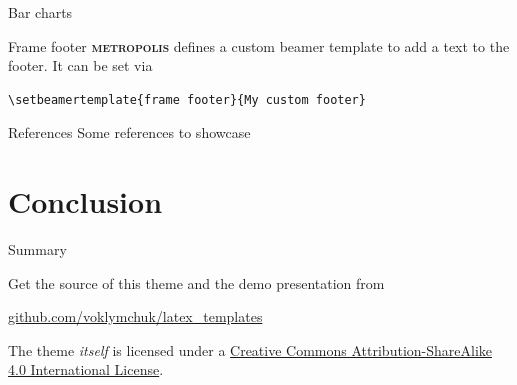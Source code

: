 \documentclass{beamer}
\newcommand{\themename}{\textbf{\textsc{metropolis}}\xspace}
\begin{document}
\begin{frame}{Bar charts}
	\begin{figure}
	\end{figure}
\end{frame}






{%
	\begin{frame}[fragile]{Frame footer}
		\themename defines a custom beamer template to add a text to the footer. It can be set via
		\begin{verbatim}\setbeamertemplate{frame footer}{My custom footer}\end{verbatim}
	\end{frame}
}

\begin{frame}{References}
	Some references to showcase~\cite{knuth92,ConcreteMath,Simpson,Er01,greenwade93}
\end{frame}

\section{Conclusion}

\begin{frame}{Summary}
	
	Get the source of this theme and the demo presentation from
	
	\begin{center}\url{github.com/voklymchuk/latex_templates}\end{center}
	
	The theme \emph{itself} is licensed under a
	\href{http://creativecommons.org/licenses/by-sa/4.0/}{Creative Commons
		Attribution-ShareAlike 4.0 International License}.
	
	\begin{center}\ccbysa\end{center}
	
\end{frame}
\end{document}
